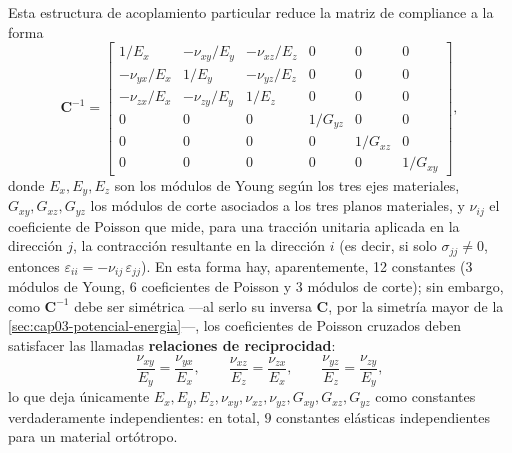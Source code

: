 Esta estructura de acoplamiento particular reduce la matriz de compliance a la forma
\[
\bm C^{-1} =
\begin{bmatrix}
1/E_x & -\nu_{xy}/E_y & -\nu_{xz}/E_z & 0 & 0 & 0 \\
-\nu_{yx}/E_x & 1/E_y & -\nu_{yz}/E_z & 0 & 0 & 0 \\
-\nu_{zx}/E_x & -\nu_{zy}/E_y & 1/E_z & 0 & 0 & 0 \\
0 & 0 & 0 & 1/G_{yz} & 0 & 0 \\
0 & 0 & 0 & 0 & 1/G_{xz} & 0 \\
0 & 0 & 0 & 0 & 0 & 1/G_{xy}
\end{bmatrix},
\]
donde $E_x,E_y,E_z$ son los módulos de Young según los tres ejes materiales, $G_{xy},G_{xz},G_{yz}$ los módulos de corte asociados a los tres planos materiales, y $\nu_{ij}$ el coeficiente de Poisson que mide, para una tracción unitaria aplicada en la dirección $j$, la contracción resultante en la dirección $i$ (es decir, si solo $\sigma_{jj}\neq 0$, entonces $\varepsilon_{ii}=-\nu_{ij}\,\varepsilon_{jj}$). En esta forma hay, aparentemente, 12 constantes (3 módulos de Young, 6 coeficientes de Poisson y 3 módulos de corte); sin embargo, como $\bm C^{-1}$ debe ser simétrica —al serlo su inversa $\bm C$, por la simetría mayor de la \cref{sec:cap03-potencial-energia}—, los coeficientes de Poisson cruzados deben satisfacer las llamadas \textbf{relaciones de reciprocidad}:
\[
\frac{\nu_{xy}}{E_y} = \frac{\nu_{yx}}{E_x}, \qquad \frac{\nu_{xz}}{E_z} = \frac{\nu_{zx}}{E_x}, \qquad \frac{\nu_{yz}}{E_z} = \frac{\nu_{zy}}{E_y},
\]
lo que deja únicamente $E_x,E_y,E_z,\nu_{xy},\nu_{xz},\nu_{yz},G_{xy},G_{xz},G_{yz}$ como constantes verdaderamente independientes: en total, $\boxed{9}$ constantes elásticas independientes para un material ortótropo.

